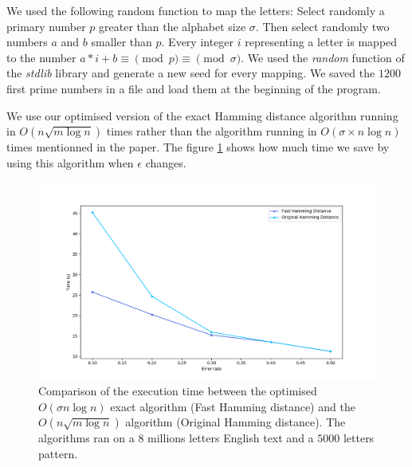\documentclass[preprint,12pt]{elsarticle}
\begin{document}
We used the following random function to map the letters:
Select randomly a primary number $p$ greater than the alphabet size $\sigma$.
Then select randomly two numbers $a$ and $b$ smaller than $p$.
Every integer $i$ representing a letter is mapped to the number
$a * i + b \equiv \pmod p \equiv \pmod \sigma$.
We used the \textit{random} function of the \textit{stdlib} library
and generate a new seed for every mapping.
We saved the $1200$ first prime numbers in a file and load them at the beginning of the program.


We use our optimised version of the exact Hamming distance algorithm
running in $O(n \sqrt{m \log n})$ times
rather than the algorithm running in $O(\sigma \times n \log n)$ times mentionned in the paper.
The figure \ref{AppHDComp} shows how much time we save by using this algorithm
when $\epsilon$ changes.




\begin{figure}[h]
\includegraphics[scale=0.45]{./figures/appHDCompareNaive.png}
\caption{Comparison of the execution time between the optimised $O(\sigma n \log n)$ exact algorithm
(Fast Hamming distance)
and the $O(n \sqrt{m \log n})$ algorithm (Original Hamming distance).
The algorithms ran on a $8$ millions letters English text and a $5000$ letters pattern.
}
\label{AppHDComp}
\end{figure}
\end{document}
